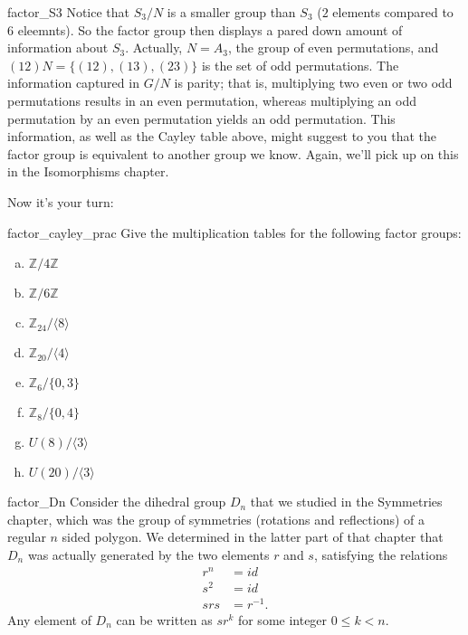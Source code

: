 {\begin{example}{factor_S3}
Notice that  $S_3 / N$ is a smaller group than $S_3$ ($2$ elements compared to $6$ eleemnts). So the factor group then displays a pared down amount of
information about $S_3$.  Actually, $N = A_3$, the group of even
permutations, and $(12) N = \{ (12), (13), (23) \}$ is the set of odd
permutations. The information captured in $G/N$ is parity; that is,
multiplying two even or two odd permutations results in an even
permutation, whereas multiplying an odd permutation by an even
permutation yields an odd permutation.  This information, as well as the Cayley table above, might suggest to you that the factor group is equivalent to another group we know.  Again, we'll pick up on this in the Isomorphisms chapter. 
\end{example}
 
 


Now it's your turn:

\begin{exercise}{factor_cayley_prac}
Give the multiplication tables for the following factor groups:

\begin{multicols}{2}
\begin{enumerate}[(a)]
\item
 ${\mathbb Z}/ 4 {\mathbb Z}$

\item
 ${\mathbb Z}/ 6 {\mathbb Z}$
\item
 ${\mathbb Z}_{24} / \langle 8 \rangle$ 

\item
 ${\mathbb Z}_{20} / \langle 4 \rangle$ 

\item
${\mathbb Z}_{6} / \{0,3\}$

\item
${\mathbb Z}_{8} / \{0,4\}$
\item
$U(8) / \langle 3 \rangle$
\item
$U(20) / \langle 3 \rangle$

\end{enumerate}
\end{multicols}
\end{exercise}
 
\begin{example}{factor_Dn}
Consider the dihedral group $D_n$ that we studied in the Symmetries chapter, which was the group of symmetries (rotations and reflections) of a regular $n$ sided polygon.  We determined in the latter part of that chapter that $D_n$ was actually generated by the two elements $r$ and $s$, satisfying the relations 
\begin{align*}
r^n & = id \\
s^2 & = id \\
srs & = r^{-1}.
\end{align*}
Any element of $D_n$ can be written as $sr^k$ for some integer $0 \le k < n$.


\end{example}}
